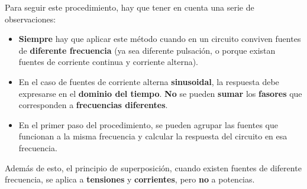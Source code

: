 	Para seguir este procedimiento, hay que tener en cuenta una serie de observaciones: 
\begin{itemize}
\item \textbf{Siempre} hay que aplicar este método cuando en un circuito conviven fuentes de \textbf{diferente frecuencia} (ya sea diferente pulsación, o porque existan fuentes de corriente continua y corriente alterna).
\item En el caso de fuentes de corriente alterna \textbf{sinusoidal}, la respuesta debe expresarse en el \textbf{dominio del tiempo}. \textbf{No} se pueden \textbf{sumar} los \textbf{fasores} que corresponden a \textbf{frecuencias diferentes}.
\item En el primer paso del procedimiento, se pueden agrupar las fuentes que funcionan a la misma frecuencia y calcular la respuesta del circuito en esa frecuencia.
\end{itemize}

Además de esto, el principio de superposición, cuando existen fuentes de diferente frecuencia, se aplica a \textbf{tensiones} y \textbf{corrientes}, pero \textbf{no} a potencias. 
	
